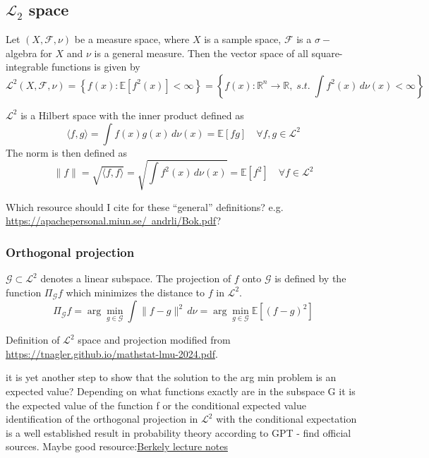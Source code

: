 \subsection{$\mathcal{L}_2$ space}
Let $(X, \mathcal{F}, \nu)$ be a measure space, where $X$ is a sample space, $\mathcal{F}$ is a $\sigma-$algebra for $X$ and $\nu$ is a general measure. Then the vector space of all square-integrable functions is given by
\[
\mathcal{L}^2(X, \mathcal{F}, \nu) = \left\{ f(x) : \mathbb{E}[f^2(x)] < \infty \right\}
= \left\{ f(x) : \mathbb{R}^{n} \to \mathbb{R}, \; \textit{s.t.} \; \int f^2(x)\, d\nu(x) < \infty \right\}
\]

$\mathcal{L}^2$ is a Hilbert space with the inner product defined as
\[
\langle f, g \rangle = \int f(x) g(x) \, d\nu(x) = \mathbb{E}[fg] \quad \forall f, g \in \mathcal{L}^2
\]
The norm is then defined as
\[
\|f\| = \sqrt{\langle f, f \rangle} = \sqrt{\int f^2(x) \, d\nu(x)} = \mathbb{E}[f^2] \quad \forall f \in \mathcal{L}^2
\]

{\color{blue} Which resource should I cite for these ``general'' definitions? e.g. \href{https://apachepersonal.miun.se/~andrli/Bok.pdf}{https://apachepersonal.miun.se/~andrli/Bok.pdf}?}

\subsubsection*{Orthogonal projection}
$\mathcal{G} \subset \mathcal{L}^2$ denotes a linear subspace. The projection of $f$ onto $\mathcal{G}$ is defined by the function $\Pi_{\mathcal{G}}f$ which minimizes the distance to $f$ in $\mathcal{L}^2$.
\[
\Pi_{\mathcal{G}}f = \arg\min_{g \in \mathcal{G}} \int \|f - g\|^2 \, d\nu
= \arg\min_{g \in \mathcal{G}} \mathbb{E}[(f - g)^2]
\]

Definition of $\mathcal{L}^2$ space and projection modified from \href{https://tnagler.github.io/mathstat-lmu-2024.pdf}{https://tnagler.github.io/mathstat-lmu-2024.pdf}.

it is yet another step to show that the solution to the arg min problem is an expected value? Depending on what functions exactly are in the subspace G it is the expected value of the function f or the conditional expected value
identification of the orthogonal projection in $\mathcal{L}^2$ with the conditional expectation is a well established result in probability theory according to GPT - find official sources.
Maybe good resource:\href{https://www.stat.berkeley.edu/~pitman/s205f02/lecture15.pdf?utm_source=chatgpt.com}{Berkely lecture notes}



